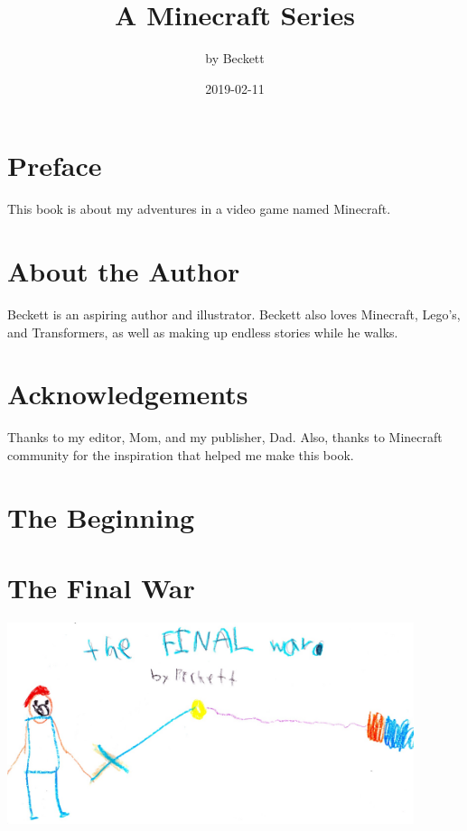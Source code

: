 \documentclass[letterpaper, oneside, 12pt]{krantz}
\title{A Minecraft Series}
\author{by Beckett}
\date{2019-02-11}
\begin{document}
\maketitle

{
\setcounter{tocdepth}{1}
\tableofcontents
}
\hypertarget{preface}{%
\chapter*{Preface}\label{preface}}


This book is about my adventures in a video game named Minecraft.

\hypertarget{about-the-author}{%
\chapter*{About the Author}\label{about-the-author}}


Beckett is an aspiring author and illustrator. Beckett also loves
Minecraft, Lego's, and Transformers, as well as making up endless
stories while he walks.

\hypertarget{acknowledgements}{%
\chapter*{Acknowledgements}\label{acknowledgements}}


Thanks to my editor, Mom, and my publisher, Dad. Also, thanks to
Minecraft community for the inspiration that helped me make this book.

\hypertarget{the-beginning}{%
\chapter{The Beginning}\label{the-beginning}}

\hypertarget{the-final-war}{%
\chapter{The Final War}\label{the-final-war}}

\includegraphics[width=4.6875in,height=\textheight]{img/final-war/final-war.jpg}
\end{document}
